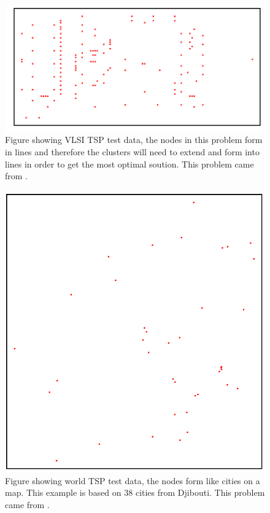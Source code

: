\begin{figure}
    \centering
    \includegraphics[width=\textwidth]{figures/vlsi_xqf131_tsp_data.png}
    \caption{Figure showing VLSI TSP test data, the nodes in this problem form in lines and therefore the clusters will need to extend and form into lines in order to get the most optimal soution. This problem came from \cite{xqf131_tsp_instance}.}
    \label{fig:vlsi_tsp_data}
\end{figure}

\begin{figure}
    \centering
    \includegraphics[width=\textwidth]{figures/world_dj38_tsp_data.png}
    \caption{Figure showing world TSP test data, the nodes form like cities on a map. This example is based on 38 cities from Djibouti. This problem came from \cite{dj38_tsp_instance}.}
    \label{fig:world_tsp_data}
\end{figure}

